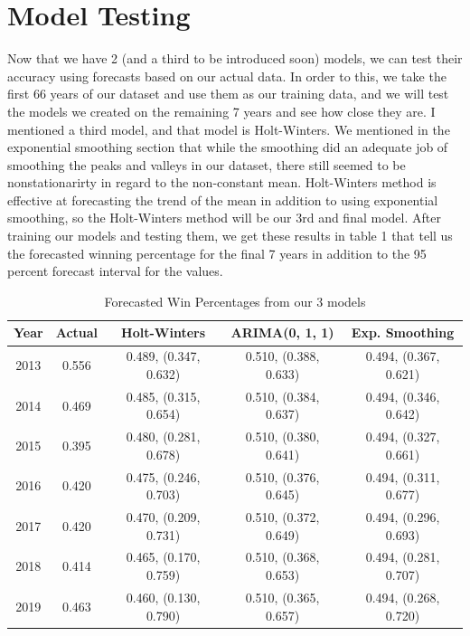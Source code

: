 \documentclass[12pt]{article}
\begin{document}
\section{Model Testing}\label{sec:chapter}
Now that we have 2 (and a third to be introduced soon) models, we can test their accuracy using forecasts based on our actual data. In order to this, we take the first 66 years of our dataset and use them as our training data, and we will test the models we created on the remaining 7 years and see how close they are. I mentioned a third model, and that model is Holt-Winters. We mentioned in the exponential smoothing section that while the smoothing did an adequate job of smoothing the peaks and valleys in our dataset, there still seemed to be nonstationarirty in regard to the non-constant mean. Holt-Winters method is effective at forecasting the trend of the mean in addition to using exponential smoothing, so the Holt-Winters method will be our 3rd and final model. After training our models and testing them, we get these results in table 1 that tell us the forecasted winning percentage for the final 7 years in addition to the 95 percent forecast interval for the values.\\
\begin{table}[h]
\begin{center}
\begin{tabular}{ |c|c|c|c|c| } 
 \hline
 \textbf{Year} & \textbf{Actual} & \textbf{Holt-Winters} & \textbf{ARIMA(0, 1, 1)} & \textbf{Exp. Smoothing} \\
 \hline
 2013 & 0.556 & 0.489, (0.347, 0.632) & 0.510, (0.388, 0.633) & 0.494, (0.367, 0.621)\\
 \hline
 2014 & 0.469 & 0.485, (0.315, 0.654) & 0.510, (0.384, 0.637) & 0.494, (0.346, 0.642)\\ 
 \hline
 2015 & 0.395 & 0.480, (0.281, 0.678) & 0.510, (0.380, 0.641) & 0.494, (0.327, 0.661)\\ 
 \hline
 2016 & 0.420 & 0.475, (0.246, 0.703) & 0.510, (0.376, 0.645) & 0.494, (0.311, 0.677)\\ 
 \hline
 2017 & 0.420 & 0.470, (0.209, 0.731) & 0.510, (0.372, 0.649) & 0.494, (0.296, 0.693)\\ 
 \hline
 2018 & 0.414 & 0.465, (0.170, 0.759) & 0.510, (0.368, 0.653) & 0.494, (0.281, 0.707)\\ 
 \hline
 2019 & 0.463 & 0.460, (0.130, 0.790) & 0.510, (0.365, 0.657) & 0.494, (0.268, 0.720)\\ 
 \hline
\end{tabular}
\caption{Forecasted Win Percentages from our 3 models}
\label{table:Table 1}
\end{center}
\end{table}\\
\end{document}
